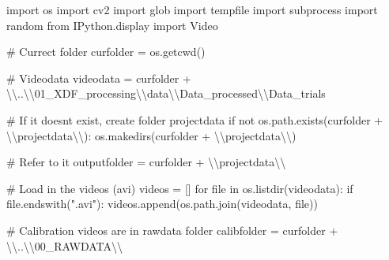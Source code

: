 \documentclass[
  letterpaper,
  DIV=11,
  numbers=noendperiod]{scrreprt}
\newenvironment{Shaded}{\begin{snugshade}}{\end{snugshade}}
\newcommand{\BuiltInTok}[1]{\textcolor[rgb]{0.00,0.23,0.31}{#1}}
\newcommand{\CharTok}[1]{\textcolor[rgb]{0.13,0.47,0.30}{#1}}
\newcommand{\CommentTok}[1]{\textcolor[rgb]{0.37,0.37,0.37}{#1}}
\newcommand{\ControlFlowTok}[1]{\textcolor[rgb]{0.00,0.23,0.31}{#1}}
\newcommand{\ImportTok}[1]{\textcolor[rgb]{0.00,0.46,0.62}{#1}}
\newcommand{\KeywordTok}[1]{\textcolor[rgb]{0.00,0.23,0.31}{#1}}
\newcommand{\NormalTok}[1]{\textcolor[rgb]{0.00,0.23,0.31}{#1}}
\newcommand{\OperatorTok}[1]{\textcolor[rgb]{0.37,0.37,0.37}{#1}}
\newcommand{\StringTok}[1]{\textcolor[rgb]{0.13,0.47,0.30}{#1}}
\begin{document}
\begin{Shaded}
\begin{Highlighting}[]
\ImportTok{import}\NormalTok{ os}
\ImportTok{import}\NormalTok{ cv2}
\ImportTok{import}\NormalTok{ glob}
\ImportTok{import}\NormalTok{ tempfile}
\ImportTok{import}\NormalTok{ subprocess}
\ImportTok{import}\NormalTok{ random}
\ImportTok{from}\NormalTok{ IPython.display }\ImportTok{import}\NormalTok{ Video}

\CommentTok{\# Currect folder}
\NormalTok{curfolder }\OperatorTok{=}\NormalTok{ os.getcwd()}

\CommentTok{\# Videodata }
\NormalTok{videodata }\OperatorTok{=}\NormalTok{ curfolder }\OperatorTok{+} \StringTok{\textquotesingle{}}\CharTok{\textbackslash{}\textbackslash{}}\StringTok{..}\CharTok{\textbackslash{}\textbackslash{}}\StringTok{01\_XDF\_processing}\CharTok{\textbackslash{}\textbackslash{}}\StringTok{data}\CharTok{\textbackslash{}\textbackslash{}}\StringTok{Data\_processed}\CharTok{\textbackslash{}\textbackslash{}}\StringTok{Data\_trials\textquotesingle{}}

\CommentTok{\# If it doesn\textquotesingle{}t exist, create folder projectdata}
\ControlFlowTok{if} \KeywordTok{not}\NormalTok{ os.path.exists(curfolder }\OperatorTok{+} \StringTok{\textquotesingle{}}\CharTok{\textbackslash{}\textbackslash{}}\StringTok{projectdata}\CharTok{\textbackslash{}\textbackslash{}}\StringTok{\textquotesingle{}}\NormalTok{):}
\NormalTok{    os.makedirs(curfolder }\OperatorTok{+} \StringTok{\textquotesingle{}}\CharTok{\textbackslash{}\textbackslash{}}\StringTok{projectdata}\CharTok{\textbackslash{}\textbackslash{}}\StringTok{\textquotesingle{}}\NormalTok{)}

\CommentTok{\# Refer to it  }
\NormalTok{outputfolder }\OperatorTok{=}\NormalTok{ curfolder }\OperatorTok{+} \StringTok{\textquotesingle{}}\CharTok{\textbackslash{}\textbackslash{}}\StringTok{projectdata}\CharTok{\textbackslash{}\textbackslash{}}\StringTok{\textquotesingle{}}

\CommentTok{\# Load in the videos (avi)}
\NormalTok{videos }\OperatorTok{=}\NormalTok{ []}
\ControlFlowTok{for} \BuiltInTok{file} \KeywordTok{in}\NormalTok{ os.listdir(videodata):}
    \ControlFlowTok{if} \BuiltInTok{file}\NormalTok{.endswith(}\StringTok{".avi"}\NormalTok{):}
\NormalTok{        videos.append(os.path.join(videodata, }\BuiltInTok{file}\NormalTok{))}

\CommentTok{\# Calibration videos are in rawdata folder}
\NormalTok{calibfolder }\OperatorTok{=}\NormalTok{ curfolder }\OperatorTok{+} \StringTok{\textquotesingle{}}\CharTok{\textbackslash{}\textbackslash{}}\StringTok{..}\CharTok{\textbackslash{}\textbackslash{}}\StringTok{00\_RAWDATA}\CharTok{\textbackslash{}\textbackslash{}}\StringTok{\textquotesingle{}}


\end{Highlighting}
\end{Shaded}
\end{document}

